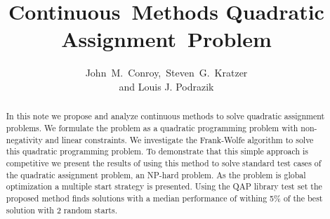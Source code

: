 \documentclass{amsart}
\title{Continuous~Methods  Quadratic
Assignment~Problem}
\author
{John~M.~Conroy,~Steven~G.~Kratzer \\ and Louis J. Podrazik}
\theoremstyle{plain} \newtheorem{Exa}{Example}[section]
\begin{document}

\begin {abstract}
In this note we propose and analyze continuous methods
to solve quadratic assignment problems.
We formulate the
problem as a quadratic programming problem with non-negativity and
linear constraints.
We investigate the Frank-Wolfe algorithm
to solve this quadratic programming problem.  To demonstrate that this
simple approach is competitive 
we present the results of using this method to
solve standard test cases of the quadratic assignment problem,
an NP-hard problem.  As the problem is global optimization a multiple
start strategy is presented.  Using the QAP library test set the proposed method
finds solutions with a median performance of withing 5\% of the best solution
with 2 random starts.  
\end {abstract}
\maketitle


\newcommand{\myepsfdef}[4]{%
    \begin{figure}[#1]
        \centerline{\epsfxsize=5.3000in \epsfbox{#2.eps}}
        \caption{#3}
        \label{#4}
    \end{figure}%
}
%
\newcommand{\bigepsfdef}[4]{%
    \begin{figure}[#1]
        \centerline{\epsfxsize=1.500in \epsfbox{#2.eps}}
        \caption{#3}
        \label{#4}
    \end{figure}%
}
%
%
\renewcommand{\topfraction}{1.0}
\renewcommand{\bottomfraction}{1.0}
\renewcommand{\textfraction}{0.0}

% 
% 
\end{document}
